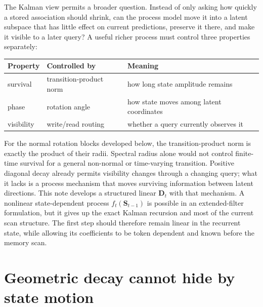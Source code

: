 \documentclass[11pt]{article}
\newcommand{\ve}[1]{\boldsymbol{#1}}
\begin{document}
The Kalman view permits a broader question. Instead of only asking how quickly a stored
association should shrink, can the process model move it into a latent subspace that has
little effect on current predictions, preserve it there, and make it visible to a later
query? A useful richer process must control three properties separately:
\begin{center}
\begin{tabular}{lll}
\toprule
Property & Controlled by & Meaning \\
\midrule
survival & transition-product norm & how long state amplitude remains \\
phase & rotation angle & how state moves among latent coordinates \\
visibility & write/read routing & whether a query currently observes it \\
\bottomrule
\end{tabular}
\end{center}
For the normal rotation blocks developed below, the transition-product norm is exactly the
product of their radii. Spectral radius alone would not control finite-time survival for a
general non-normal or time-varying transition. Positive diagonal decay already permits
visibility changes through a changing query; what it lacks is a process mechanism that moves
surviving information between latent directions. This note develops a structured linear
$\ve{D}_t$ with that mechanism. A nonlinear
state-dependent process $f_t(\ve{S}_{t-1})$ is possible in an extended-filter formulation,
but it gives up the exact Kalman recursion and most of the current scan structure. The first
step should therefore remain linear in the recurrent state, while allowing its coefficients
to be token dependent and known before the memory scan.


\section{Geometric decay cannot hide by state motion}
\end{document}
